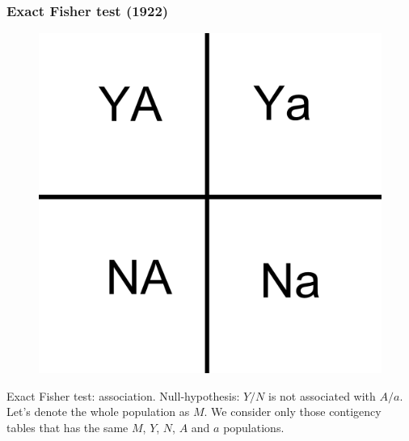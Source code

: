 \documentclass{beamer}
\renewcommand*{\thesubfigure}{}
\begin{document}
	\begin{frame}
	\frametitle{Exact Fisher test (1922)}
		\begin{center}
		\begin{figure}[ht]
			\includegraphics[scale=0.4]{fisher-contig}
		\end{figure}
		\end{center}
	Exact Fisher test: association. Null-hypothesis: $Y/N$ is not associated with $A/a$. Let's denote the whole population as $M$. We consider only those contigency tables that has the same $M$, $Y$, $N$, $A$ and $a$ populations.


\end{frame}
\end{document}
